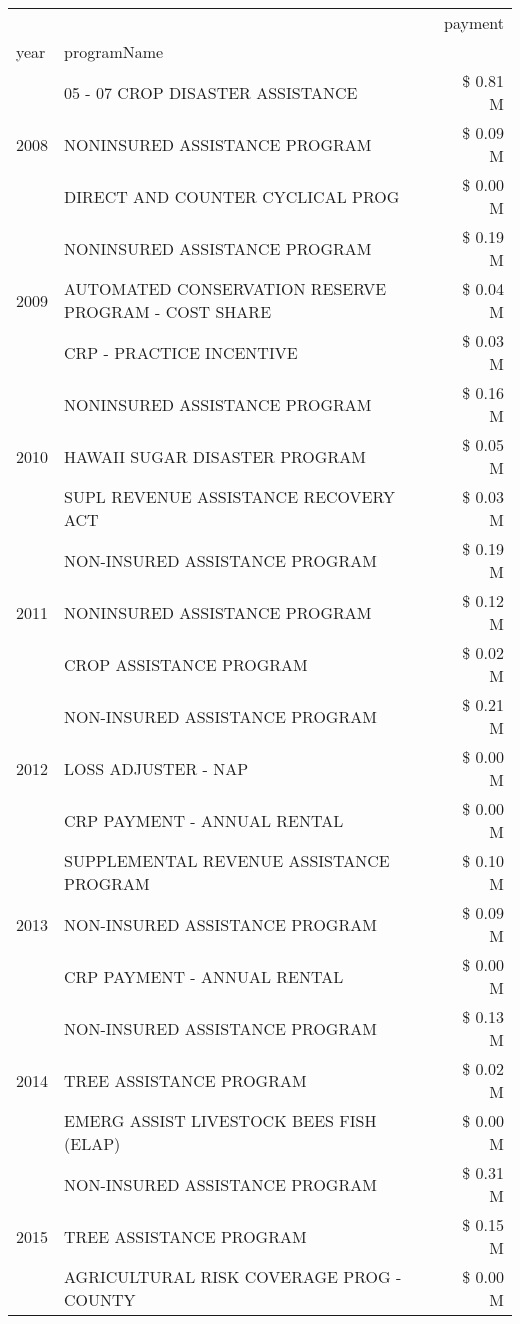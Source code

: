 \begin{tabular}{llr}
\toprule
 &  & payment \\
year & programName &  \\
\midrule
\multirow[t]{3}{*}{2008} & 05 - 07 CROP DISASTER ASSISTANCE & \$ 0.81 M \\
 & NONINSURED ASSISTANCE PROGRAM & \$ 0.09 M \\
 & DIRECT AND COUNTER CYCLICAL PROG & \$ 0.00 M \\
\cline{1-3}
\multirow[t]{3}{*}{2009} & NONINSURED ASSISTANCE PROGRAM & \$ 0.19 M \\
 & AUTOMATED CONSERVATION RESERVE PROGRAM - COST SHARE & \$ 0.04 M \\
 & CRP - PRACTICE INCENTIVE & \$ 0.03 M \\
\cline{1-3}
\multirow[t]{3}{*}{2010} & NONINSURED ASSISTANCE PROGRAM & \$ 0.16 M \\
 & HAWAII SUGAR DISASTER PROGRAM & \$ 0.05 M \\
 & SUPL REVENUE ASSISTANCE RECOVERY ACT & \$ 0.03 M \\
\cline{1-3}
\multirow[t]{3}{*}{2011} & NON-INSURED ASSISTANCE PROGRAM & \$ 0.19 M \\
 & NONINSURED ASSISTANCE PROGRAM & \$ 0.12 M \\
 & CROP ASSISTANCE PROGRAM & \$ 0.02 M \\
\cline{1-3}
\multirow[t]{3}{*}{2012} & NON-INSURED ASSISTANCE PROGRAM & \$ 0.21 M \\
 & LOSS ADJUSTER - NAP & \$ 0.00 M \\
 & CRP PAYMENT - ANNUAL RENTAL & \$ 0.00 M \\
\cline{1-3}
\multirow[t]{3}{*}{2013} & SUPPLEMENTAL REVENUE ASSISTANCE PROGRAM & \$ 0.10 M \\
 & NON-INSURED ASSISTANCE PROGRAM & \$ 0.09 M \\
 & CRP PAYMENT - ANNUAL RENTAL & \$ 0.00 M \\
\cline{1-3}
\multirow[t]{3}{*}{2014} & NON-INSURED ASSISTANCE PROGRAM & \$ 0.13 M \\
 & TREE ASSISTANCE PROGRAM & \$ 0.02 M \\
 & EMERG ASSIST LIVESTOCK BEES FISH (ELAP) & \$ 0.00 M \\
\cline{1-3}
\multirow[t]{3}{*}{2015} & NON-INSURED ASSISTANCE PROGRAM & \$ 0.31 M \\
 & TREE ASSISTANCE PROGRAM & \$ 0.15 M \\
 & AGRICULTURAL RISK COVERAGE PROG - COUNTY & \$ 0.00 M \\

\end{tabular}
